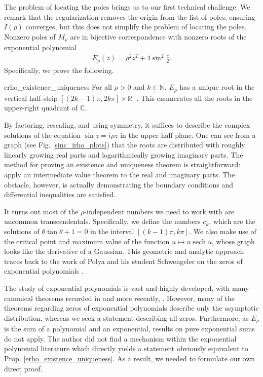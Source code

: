 \documentclass{amsart}
\theoremstyle{plain}
\numberwithin{theorem}{section}
\DeclareMathOperator{\sech}{sech}
\theoremstyle{definition}
\theoremstyle{remark}
\theoremstyle{brakets}
\newcommand{\R}{\mathbb{R}}
\newcommand{\C}{\mathbb{C}}
\newcommand{\N}{\mathbb{N}}
\begin{document}
The problem of locating the poles brings us to our first technical challenge. We remark that the regularization removes the origin from the list of poles, ensuring $I(\rho)$ converges, but this does not simplify the problem of locating the poles. Nonzero poles of $M_\rho$ are in bijective correspondence with nonzero roots of the exponential polynomial
\begin{align*}
    E_\rho(z) = \rho^2z^2 + 4\sin^2 \frac{z}{2}.
\end{align*}
Specifically, we prove the following.
\begin{repprop}{erho_existence_uniqueness}
    For all $\rho > 0$ and $k \in \N$, $E_\rho$ has a unique root in the vertical half-strip $[(2k-1)\pi,2k\pi] \times \R^+$. This enumerates all the roots in the upper-right quadrant of $\C$.
\end{repprop}

By factoring, rescaling, and using symmetry, it suffices to describe the complex solutions of the equation $\sin z = i\rho z$ in the upper-half plane. One can see from a graph (see Fig. \ref{sinc_irho_plots}) that the roots are distributed with roughly linearly growing real parts and logarithmically growing imaginary parts. The method for proving an existence and uniqueness theorem is straightforward: apply an intermediate value theorem to the real and imaginary parts. The obstacle, however, is actually demonstrating the boundary conditions and differential inequalities are satisfied.


It turns out most of the $\rho$-independent numbers we need to work with are uncommon transcendentals. Specifically, we define the numbers $c_k$, which are the solutions of $\theta \tan \theta + 1 = 0$ in the interval $[(k-1)\pi,k\pi]$. We also make use of the critical point and maximum value of the function $u \mapsto u\sech u$, whose graph looks like the derivative of a Gaussian. This geometric and analytic approach traces back to the work of Polya and his student Schwengeler on the zeros of exponential polynomials \cite{polya1920,schwengeler1925}. 

The study of exponential polynomials is vast and highly developed, with many canonical theorems recorded in \cite{langer31} and more recently, \cite{hitw23}. However, many of the theorems regarding zeros of exponential polynomials describe only the asymptotic distribution, whereas we seek a statement describing all zeros. Furthermore, as $E_\rho$ is the sum of a polynomial and an exponential, results on pure exponential sums do not apply. The author did not find a mechanism within the exponential polynomial literature which directly yields a statement obviously equivalent to Prop. \ref{erho_existence_uniqueness}. As a result, we needed to formulate our own direct proof.
\end{document}
